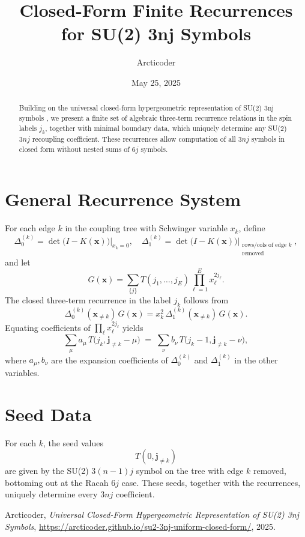 \documentclass{article}
\title{Closed-Form Finite Recurrences for SU(2) 3nj Symbols}
\author{Arcticoder}
\date{May 25, 2025}
\begin{document}
\maketitle

\begin{abstract}
Building on the universal closed-form hypergeometric representation of SU(2) 3nj symbols \cite{arcticoder2025}, we present a finite set of algebraic three-term recurrence relations in the spin labels \(j_k\), together with minimal boundary data, which uniquely determine any SU(2) \(3nj\) recoupling coefficient. These recurrences allow computation of all \(3nj\) symbols in closed form without nested sums of \(6j\) symbols.
\end{abstract}

\section{General Recurrence System}
For each edge \(k\) in the coupling tree with Schwinger variable \(x_k\), define
\[
\Delta_0^{(k)} = \det\bigl(I - K(\mathbf x)\bigr)\big|_{x_k=0},
\quad
\Delta_1^{(k)} = \det\bigl(I - K(\mathbf x)\bigr)\bigl|_{\substack{\text{rows/cols of edge }k\\\text{removed}}},
\]
and let
\[
G(\mathbf x) = \sum_{\{j\}} T(j_1,\dots,j_E)\prod_{\ell=1}^E x_\ell^{2j_\ell}.
\]
The closed three-term recurrence in the label \(j_k\) follows from
\[
\Delta_0^{(k)}(\mathbf x_{\ne k})\,G(\mathbf x)
= x_k^2\,\Delta_1^{(k)}(\mathbf x_{\ne k})\,G(\mathbf x).
\]
Equating coefficients of \(\prod_\ell x_\ell^{2j_\ell}\) yields
\[
\sum_{\mu}a_{\mu}\,
T\bigl(j_k,\mathbf j_{\ne k}-\mu\bigr)
\;=\;
\sum_{\nu}b_{\nu}\,
T\bigl(j_k-1,\mathbf j_{\ne k}-\nu\bigr),
\]
where \(a_{\mu},b_{\nu}\) are the expansion coefficients of \(\Delta_0^{(k)}\) and \(\Delta_1^{(k)}\) in the other variables.

\section{Seed Data}
For each \(k\), the seed values
\[
T(0,\mathbf j_{\ne k})
\]
are given by the SU(2) \(3(n-1)j\) symbol on the tree with edge \(k\) removed, bottoming out at the Racah \(6j\) case. These seeds, together with the recurrences, uniquely determine every \(3nj\) coefficient.


\begin{thebibliography}{1}
Arcticoder,
\emph{Universal Closed-Form Hypergeometric Representation of SU(2) 3nj Symbols},
\url{https://arcticoder.github.io/su2-3nj-uniform-closed-form/},
2025.
\end{thebibliography}
\end{document}
